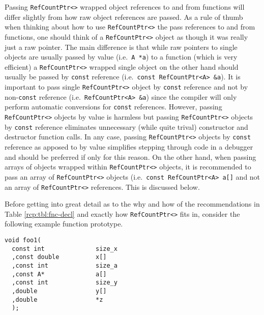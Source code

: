 Passing {}\texttt{Ref\-Count\-Ptr<>} wrapped object references to and
from functions will differ slightly from how raw object references are
passed.  As a rule of thumb when thinking about how to use
{}\texttt{Ref\-Count\-Ptr<>} the pass references to and from
functions, one should think of a {}\texttt{Ref\-Count\-Ptr<>} object
as though it was really just a raw pointer.  The main difference is
that while raw pointers to single objects are usually passed by value
(i.e.~{}\texttt{A *a}) to a function (which is very efficient) a
{}\texttt{Ref\-Count\-Ptr<>} wrapped single object on the other hand
should usually be passed by {}\texttt{const} reference
(i.e.~{}\texttt{const Ref\-Count\-Ptr<A> \&a}).  It is important to
pass single {}\texttt{Ref\-Count\-Ptr<>} object by {}\texttt{const}
reference and not by non-{}\texttt{const} reference
(i.e.~{}\texttt{Ref\-Count\-Ptr<A> \&a}) since the compiler will only
perform automatic conversions for {}\texttt{const} references.
However, passing {}\texttt{Ref\-Count\-Ptr<>} objects by value is
harmless but passing {}\texttt{Ref\-Count\-Ptr<>} objects by
{}\texttt{const} reference eliminates unnecessary (while quite trival)
constructor and destructor function calls.  In any case, passing
{}\texttt{Ref\-Count\-Ptr<>} objects by {}\texttt{const} reference as
apposed to by value simplifies stepping through code in a debugger and
should be preferred if only for this reason.  On the other hand, when
passing arrays of objects wrapped within {}\texttt{Ref\-Count\-Ptr<>}
objects, it is recommended to pass an array of
{}\texttt{Ref\-Count\-Ptr<>} objects (i.e.~{}\texttt{const
Ref\-Count\-Ptr<A> a[]} and not an array of
{}\texttt{Ref\-Count\-Ptr<>} references.  This is discussed below.

Before getting into great detail as to the why and how of the
recommendations in Table {}\ref{rcp:tbl:fnc-decl} and exactly how
{}\texttt{Ref\-Count\-Ptr<>} fits in, consider the following example
function prototype.

{\scriptsize\begin{verbatim}
void foo1(
  const int              size_x
  ,const double          x[]
  ,const int             size_a
  ,const A*              a[]
  ,const int             size_y
  ,double                y[]
  ,double                *z
  );
\end{verbatim}}


